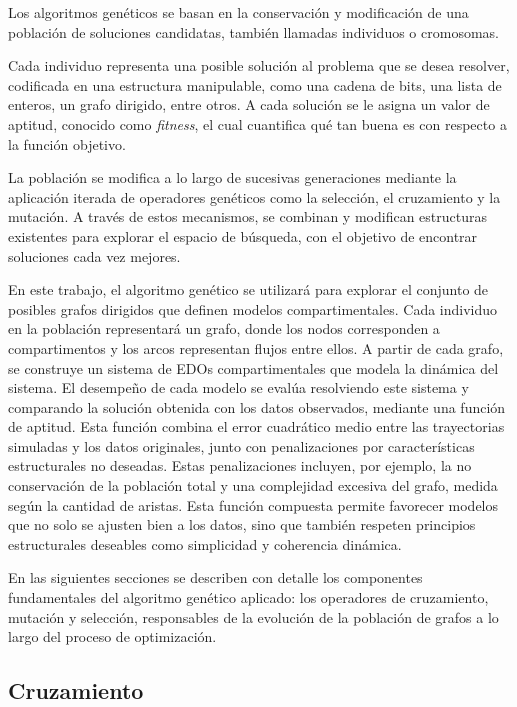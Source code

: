 Los algoritmos genéticos se basan en la conservación y modificación de una población de soluciones candidatas, también llamadas individuos o cromosomas.

Cada individuo representa una posible solución al problema que se desea resolver, codificada en una estructura manipulable, como una cadena de bits, una lista de 
enteros, un grafo dirigido, entre otros. A cada solución se le asigna un valor de aptitud, conocido como \textit{fitness}, el cual cuantifica qué tan buena es con 
respecto a la función objetivo.

La población se modifica a lo largo de sucesivas generaciones mediante la aplicación iterada de operadores genéticos como la selección, el cruzamiento y la mutación. 
A través de estos mecanismos, se combinan y modifican estructuras existentes para explorar el espacio de búsqueda, con el objetivo de encontrar 
soluciones cada vez mejores.

En este trabajo, el algoritmo genético se utilizará para explorar el conjunto de posibles grafos dirigidos que definen modelos compartimentales. Cada individuo 
en la población representará un grafo, donde los nodos corresponden a compartimentos y los arcos representan flujos entre ellos. A partir de cada grafo, se construye 
un sistema de EDOs compartimentales que modela la dinámica del sistema. El desempeño de cada modelo se evalúa resolviendo este sistema y comparando la solución 
obtenida con los datos observados, mediante una función de aptitud. Esta función combina el error cuadrático medio entre las trayectorias simuladas y los datos 
originales, junto con penalizaciones por características estructurales no deseadas. Estas penalizaciones incluyen, por ejemplo, la no conservación de la población total 
y una complejidad excesiva del grafo, medida según la cantidad de aristas. Esta función compuesta permite favorecer modelos que no solo se ajusten bien a los datos, 
sino que también respeten principios estructurales deseables como simplicidad y coherencia dinámica.

En las siguientes secciones se describen con detalle los componentes fundamentales del algoritmo genético 
aplicado: los operadores de cruzamiento, mutación y selección, responsables de la evolución de la población de grafos a lo largo del proceso de optimización.

\subsection{Cruzamiento}

